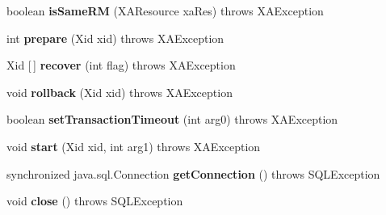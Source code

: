 \begin{DoxyCompactItemize}
boolean {\bfseries is\+Same\+RM} (X\+A\+Resource xa\+Res)  throws X\+A\+Exception 
\item 
\mbox{\label{classcom_1_1mysql_1_1jdbc_1_1jdbc2_1_1optional_1_1_suspendable_x_a_connection_a0722a05ae24172feb143a8b2abffbb53}} 
int {\bfseries prepare} (Xid xid)  throws X\+A\+Exception 
\item 
\mbox{\label{classcom_1_1mysql_1_1jdbc_1_1jdbc2_1_1optional_1_1_suspendable_x_a_connection_ad087dd89d2e06d5bf38852aa485a658c}} 
Xid \mbox{[}$\,$\mbox{]} {\bfseries recover} (int flag)  throws X\+A\+Exception 
\item 
\mbox{\label{classcom_1_1mysql_1_1jdbc_1_1jdbc2_1_1optional_1_1_suspendable_x_a_connection_aa11a68ca60095cc3280f3d276f740ced}} 
void {\bfseries rollback} (Xid xid)  throws X\+A\+Exception 
\item 
\mbox{\label{classcom_1_1mysql_1_1jdbc_1_1jdbc2_1_1optional_1_1_suspendable_x_a_connection_aa3d129586feade3f6ca434ca85cf09bc}} 
boolean {\bfseries set\+Transaction\+Timeout} (int arg0)  throws X\+A\+Exception 
\item 
\mbox{\label{classcom_1_1mysql_1_1jdbc_1_1jdbc2_1_1optional_1_1_suspendable_x_a_connection_a83629a383f11b157b2ade91cbbd0648c}} 
void {\bfseries start} (Xid xid, int arg1)  throws X\+A\+Exception 
\item 
\mbox{\label{classcom_1_1mysql_1_1jdbc_1_1jdbc2_1_1optional_1_1_suspendable_x_a_connection_a0d2850615ccd77af3518122508a0b5be}} 
synchronized java.\+sql.\+Connection {\bfseries get\+Connection} ()  throws S\+Q\+L\+Exception 
\item 
\mbox{\label{classcom_1_1mysql_1_1jdbc_1_1jdbc2_1_1optional_1_1_suspendable_x_a_connection_a511522fb921339ebf28ef4d923258404}} 
void {\bfseries close} ()  throws S\+Q\+L\+Exception 
\end{DoxyCompactItemize}
